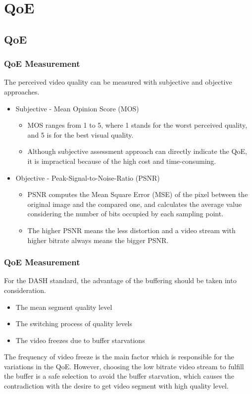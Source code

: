 \documentclass[table]{beamer}
\begin{document}
\section{QoE}
\subsection{QoE}
\begin{frame}
	\frametitle{QoE Measurement}
The perceived video quality can be measured with subjective and objective approaches.
\begin{itemize}
\item Subjective - Mean Opinion Score (MOS)
\begin{itemize}
\item MOS ranges from 1 to 5, where 1 stands for the worst perceived quality, and 5 is for the best visual quality.
\item Although subjective assessment approach can directly indicate the QoE, it is impractical because of the high cost and time-consuming.
\end{itemize} 
\item Objective - Peak-Signal-to-Noise-Ratio (PSNR)
\begin{itemize}
\item PSNR computes the Mean Square Error (MSE) of the pixel between the original image and the compared one, and calculates the average value considering the number of bits occupied by each sampling point.
\item The higher PSNR means the less distortion and a video stream with higher bitrate always means the bigger PSNR.
\end{itemize} 
\end{itemize}
\end{frame}

\begin{frame}
	\frametitle{QoE Measurement}
For the DASH standard, the advantage of the buffering should be taken into consideration. 
\begin{itemize}
\item The mean segment quality level
\item The switching process of quality levels
\item The video freezes due to buffer starvations
\end{itemize}
\vspace{10pt}

The frequency of video freeze is the main factor which is responsible for the variations in the QoE. However, choosing the low bitrate video stream to fulfill the buffer is a safe selection to avoid the buffer starvation, which causes the contradiction with the desire to get video segment with high quality level.
\end{frame}
\end{document}
